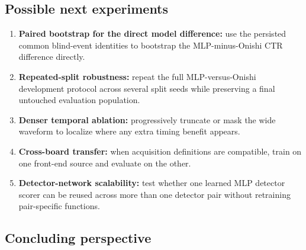 \subsection{Possible next experiments}

\begin{enumerate}
    \item \textbf{Paired bootstrap for the direct model difference:} use the persisted common blind-event identities to bootstrap the MLP-minus-Onishi CTR difference directly.
    \item \textbf{Repeated-split robustness:} repeat the full MLP-versus-Onishi development protocol across several split seeds while preserving a final untouched evaluation population.
    \item \textbf{Denser temporal ablation:} progressively truncate or mask the wide waveform to localize where any extra timing benefit appears.
    \item \textbf{Cross-board transfer:} when acquisition definitions are compatible, train on one front-end source and evaluate on the other.
    \item \textbf{Detector-network scalability:} test whether one learned MLP detector scorer can be reused across more than one detector pair without retraining pair-specific functions.
\end{enumerate}

\subsection{Concluding perspective}

